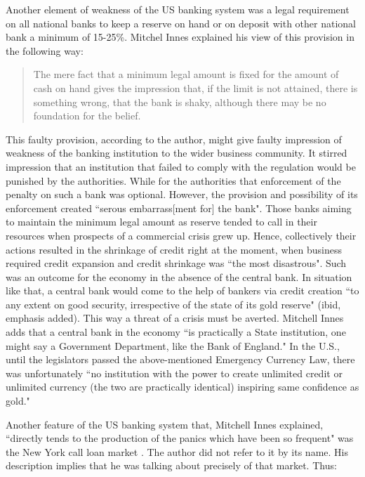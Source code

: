 Another element of weakness of the US banking system was a legal requirement on all national banks to keep a reserve on hand or on deposit with other national bank a minimum of 15-25\%. Mitchel Innes explained his view of this provision in the following way:

\begin{quote}
The mere fact that a minimum legal amount is fixed for the amount of cash on hand gives the impression that, if the limit is not attained, there is something wrong, that the bank is shaky, although there may be no foundation for the belief. 
 \citep{innes1910}
\end{quote}

This faulty provision, according to the author, might give faulty impression of weakness of the banking institution to the wider business community. It stirred impression that an institution that failed to comply with the regulation would be punished by the authorities. While for the authorities that enforcement of the penalty on such a bank was optional. However, the provision and possibility of its enforcement created ``serous embarrass[ment for] the bank". Those banks aiming to maintain the minimum legal amount as reserve tended to call in their resources when prospects of a commercial crisis grew up. Hence, collectively their actions resulted in the shrinkage of credit right at the moment, when business required credit expansion and credit shrinkage was ``the most disastrous". Such was an outcome for the economy in the absence of the central bank. In situation like that, a central bank would come to the help of bankers via credit creation ``to any extent on good security, irrespective of the state of its gold reserve" (ibid, emphasis added). This way a threat of a crisis must be averted. Mitchell Innes adds that a central bank in the economy ``is practically a State institution, one might say a Government Department, like the Bank of England." In the U.S., until the legislators passed the above-mentioned Emergency Currency Law, there was unfortunately ``no institution with the power to create unlimited credit or unlimited currency (the two are practically identical) inspiring same confidence as gold."

Another feature of the US banking system that, Mitchell Innes explained, ``directly tends to the production of the panics which have been so frequent" was the New York call loan market . The author did not refer to it by its name. His description implies that he was talking about precisely of that market. Thus:

